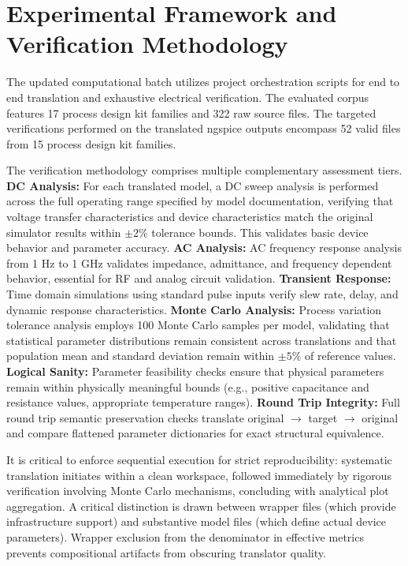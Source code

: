 \documentclass[10pt,twocolumn]{article}
\begin{document}
\section{Experimental Framework and Verification Methodology}
The updated computational batch utilizes project orchestration scripts for end to end translation and exhaustive electrical verification. The evaluated corpus features 17 process design kit families and 322 raw source files. The targeted verifications performed on the translated ngspice outputs encompass 52 valid files from 15 process design kit families.

The verification methodology comprises multiple complementary assessment tiers. \textbf{DC Analysis:} For each translated model, a DC sweep analysis is performed across the full operating range specified by model documentation, verifying that voltage transfer characteristics and device characteristics match the original simulator results within $\pm 2\%$ tolerance bounds. This validates basic device behavior and parameter accuracy. \textbf{AC Analysis:} AC frequency response analysis from 1 Hz to 1 GHz validates impedance, admittance, and frequency dependent behavior, essential for RF and analog circuit validation. \textbf{Transient Response:} Time domain simulations using standard pulse inputs verify slew rate, delay, and dynamic response characteristics. \textbf{Monte Carlo Analysis:} Process variation tolerance analysis employs 100 Monte Carlo samples per model, validating that statistical parameter distributions remain consistent across translations and that population mean and standard deviation remain within $\pm 5\%$ of reference values. \textbf{Logical Sanity:} Parameter feasibility checks ensure that physical parameters remain within physically meaningful bounds (e.g., positive capacitance and resistance values, appropriate temperature ranges). \textbf{Round Trip Integrity:} Full round trip semantic preservation checks translate original $\rightarrow$ target $\rightarrow$ original and compare flattened parameter dictionaries for exact structural equivalence.

It is critical to enforce sequential execution for strict reproducibility: systematic translation initiates within a clean workspace, followed immediately by rigorous verification involving Monte Carlo mechanisms, concluding with analytical plot aggregation. A critical distinction is drawn between wrapper files (which provide infrastructure support) and substantive model files (which define actual device parameters). Wrapper exclusion from the denominator in effective metrics prevents compositional artifacts from obscuring translator quality.
\end{document}

